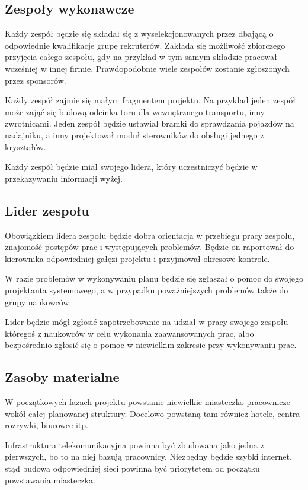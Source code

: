 \subsection{Zespoły wykonawcze}
Każdy zespół będzie się składał się z wyselekcjonowanych przez dbającą o odpowiednie kwalifikacje grupę rekruterów.
Zakłada się możliwość zbiorczego przyjęcia całego zespołu, gdy na przykład w tym samym składzie pracował wcześniej w innej firmie.
Prawdopodobnie wiele zespołów zostanie zgłoszonych przez sponsorów.

Każdy zespół zajmie się małym fragmentem projektu. Na przykład jeden zespół może zająć się budową odcinka toru dla wewnętrznego transportu, inny zwrotnicami.
Jeden zespół będzie ustawiał bramki do sprawdzania pojazdów na nadajniku, a inny projektował moduł sterowników do obsługi jednego z kryształów.

Każdy zespół będzie miał swojego lidera, który uczestniczyć będzie w przekazywaniu informacji wyżej.

\subsection{Lider zespołu}
Obowiązkiem lidera zespołu będzie dobra orientacja w przebiegu pracy zespołu, znajomość postępów prac i występujących problemów. 
Będzie on raportował do kierownika odpowiedniej gałęzi projektu i przyjmował okresowe kontrole.

W razie problemów w wykonywaniu planu będzie się zgłaszał o pomoc do swojego projektanta systemowego, a w przypadku poważniejszych problemów także do grupy naukowców.

Lider będzie mógł zgłosić zapotrzebowanie na udział w pracy swojego zespołu któregoś z naukowców w celu wykonania zaawansowanych prac, albo bezpośrednio zgłosić się o pomoc w niewielkim zakresie przy wykonywaniu prac.

\subsection{Zasoby materialne}
W początkowych fazach projektu powstanie niewielkie miasteczko pracownicze wokół całej planowanej struktury. Docelowo powstaną tam również hotele, centra rozrywki, biurowce itp.

Infrastruktura telekomunikacyjna powinna być zbudowana jako jedna z pierwszych, bo to na niej bazują pracownicy. Niezbędny będzie szybki internet, stąd budowa odpowiedniej sieci powinna być priorytetem od początku powstawania miasteczka.

